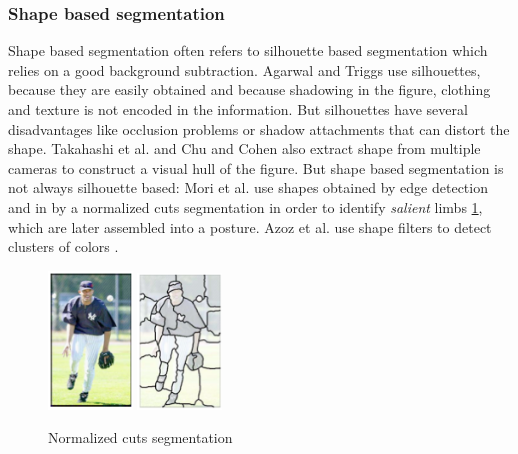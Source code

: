 \subsubsection{Shape based segmentation}
Shape based segmentation often refers to silhouette based segmentation which relies on a good background subtraction. Agarwal and Triggs use silhouettes, because they are easily obtained and because shadowing in the figure, clothing and texture is not encoded in the information. But silhouettes have several disadvantages like occlusion problems or shadow attachments that can distort the shape. 
Takahashi et al. \cite{Takahashi} and Chu and Cohen \cite{Chu} also extract shape from multiple cameras to construct a visual hull of the figure. But shape based segmentation is not always silhouette based: Mori et al. use shapes obtained by edge detection \cite{Mori-a} and in \cite{Mori} by a normalized cuts segmentation in order to identify \textit{salient} limbs \ref{fig:normalizedcuts}, which are later assembled into a posture. Azoz et al. use shape filters to detect clusters of colors \cite{Azoz}. 
\begin{figure}[h!]
\center
\includegraphics[width=0.2\textwidth]{images/seminar/normalizedcuts1.png}
\includegraphics[width=0.2\textwidth]{images/seminar/normalizedcuts2.png}
\caption{Normalized cuts segmentation \cite{Mori}}
\label{fig:normalizedcuts}
\end{figure}

